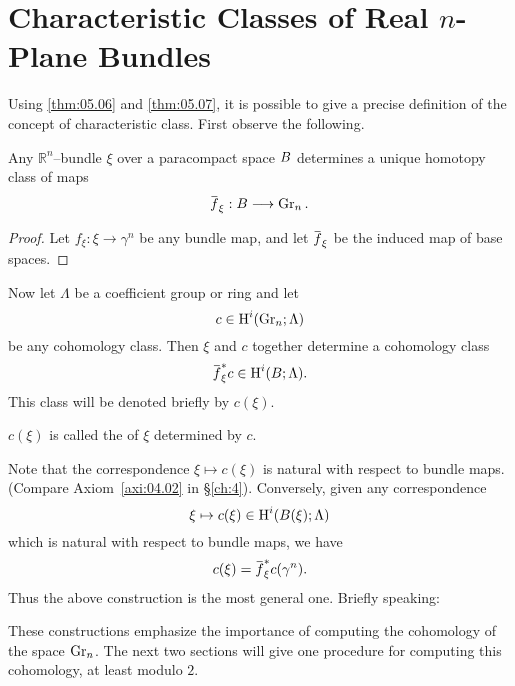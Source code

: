 \documentclass[../main]{subfiles}
\begin{document}
\section{Characteristic Classes of Real \texorpdfstring{$n$}{n}-Plane Bundles}\label{5.4}
Using \ref{thm:05.06} and \ref{thm:05.07}, it is possible to give a precise definition of the concept of characteristic class. First observe the following.

\begin{corollary}
\label{cor:5.10}
Any ${\mathbb R}^n$--bundle $\xi$ over a paracompact space $B$ determines a unique homotopy class of maps \[{\xoverline f}_\xi : \base \longrightarrow \grassmannian_n.\] 
\end{corollary}

\begin{proof}
Let $f_\xi : \xi \longrightarrow \gamma^n$ be any bundle map, and let ${\xoverline f}_\xi$ be the induced map of base spaces.
\end{proof}

Now let $\Lambda$ be a coefficient group or ring and let \[c \in \operatorname{H}^i(\operatorname{Gr}_n; \Lambda)\] be any cohomology class. Then $\xi$ and $c$ together determine a cohomology class \[{\xoverline f}_\xi^\ast c \in \homology^i(\base; \Lambda).\] This class will be denoted briefly by $c(\xi)$. 

\begin{definition}
$c(\xi)$ is called the  of $\xi$ determined by $c$.
\end{definition}

Note that the correspondence $\xi \mapsto c(\xi)$ is natural with respect to bundle maps. (Compare Axiom~\ref{axi:04.02} in \S\ref{ch:4}). Conversely, given any correspondence \[\xi \mapsto c(\xi) \in \operatorname{H}^i(B(\xi); \Lambda)\] which is natural with respect to bundle maps, we have \[c(\xi) = {\xoverline f}_\xi^\ast c(\gamma^n).\] Thus the above construction is the most general one. Briefly speaking:  

These constructions emphasize the importance of computing the cohomology of the space $\operatorname{Gr}_n$. The next two sections will give one procedure for computing this cohomology, at least modulo $2$.
\end{document}

